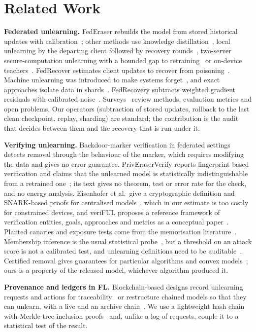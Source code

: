 \documentclass[journal]{IEEEtran}
\begin{document}
\section{Related Work}
\textbf{Federated unlearning.} FedEraser rebuilds the model from stored historical updates with calibration~\cite{liu2021federaser}; other methods use knowledge distillation~\cite{wu2022kd}, local unlearning by the departing client followed by recovery rounds~\cite{halimi2022}, two-server secure-computation unlearning with a bounded gap to retraining~\cite{certified2024} or on-device teachers~\cite{fedquit2024}. FedRecover estimates client updates to recover from poisoning~\cite{cao2023fedrecover}. Machine unlearning was introduced to make systems forget~\cite{cao2015}, and exact approaches isolate data in shards~\cite{bourtoule2021}. FedRecovery subtracts weighted gradient residuals with calibrated noise~\cite{zhang2023fedrecovery}. Surveys~\cite{liu2024survey,romandini2024} review methods, evaluation metrics and open problems. Our operators (subtraction of stored updates, rollback to the last clean checkpoint, replay, sharding) are standard; the contribution is the audit that decides between them and the recovery that is run under it.

\textbf{Verifying unlearning.} Backdoor-marker verification in federated settings~\cite{gao2024verifi} detects removal through the behaviour of the marker, which requires modifying the data and gives no error guarantee. PrivEraserVerify reports fingerprint-based verification and claims that the unlearned model is statistically indistinguishable from a retrained one~\cite{goswami2026}; its text gives no theorem, test or error rate for the check, and no energy analysis. Eisenhofer et al.\ give a cryptographic definition and SNARK-based proofs for centralised models~\cite{eisenhofer2025}, which in our estimate is too costly for constrained devices, and veriFUL proposes a reference framework of verification entities, goals, approaches and metrics as a conceptual paper~\cite{nguyen2026}. Planted canaries and exposure tests come from the memorisation literature~\cite{carlini2019}. Membership inference is the usual statistical probe~\cite{shokri2017,yeom2018}, but a threshold on an attack score is not a calibrated test, and unlearning definitions need to be auditable~\cite{thudi2022}. Certified removal gives guarantees for particular algorithms and convex models~\cite{guo2020}; ours is a property of the released model, whichever algorithm produced it.

\textbf{Provenance and ledgers in FL.} Blockchain-based designs record unlearning requests and actions for traceability~\cite{zuo2024} or restructure chained models so that they can unlearn, with a live and an archive chain~\cite{blockful2024}. We use a lightweight hash chain with Merkle-tree inclusion proofs~\cite{merkle1980,merkle1987} and, unlike a log of requests, couple it to a statistical test of the result.
\end{document}
